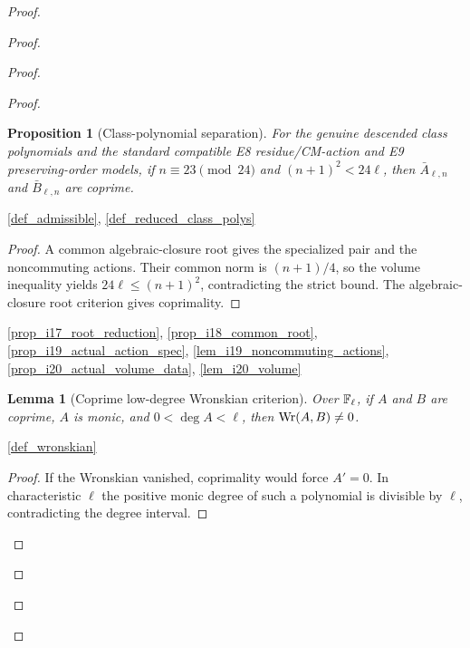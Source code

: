\documentclass[11pt,a4paper]{article}
\numberwithin{equation}{section}
\theoremstyle{plain}\newtheorem{theorem}{Theorem}[section]\newaliascnt{proposition}{theorem}\newtheorem{proposition}[proposition]{Proposition}\aliascntresetthe{proposition}\newaliascnt{lemma}{theorem}\newtheorem{lemma}[lemma]{Lemma}\aliascntresetthe{lemma}
\theoremstyle{definition}\newaliascnt{definition}{theorem}\newtheorem{definition}[definition]{Definition}\aliascntresetthe{definition}\newaliascnt{notation}{theorem}\newtheorem{notation}[notation]{Notation}\aliascntresetthe{notation}
\providecommand{\lean}[1]{}\providecommand{\leanok}{}
\begin{document}
\begin{proof}
\begin{proof}
\begin{proof}
\begin{proof}
\begin{proposition}[Class-polynomial separation]\label{prop_class_poly_separation}\lean{SptCM.CM.Repaired.ActualClassPolynomialSpec.actualClassPolynomials_isCoprime_of_goodReduction_E8_E9}\leanok
For the genuine descended class polynomials and the standard compatible
E8 residue/CM-action and E9 preserving-order models, if
$n\equiv23\pmod {24}$ and $(n+1)^2<24\ell$, then
$\bar A_{\ell,n}$ and $\bar B_{\ell,n}$ are coprime.
\end{proposition}
\begin{uses-statement}\ref{def_admissible}, \ref{def_reduced_class_polys}\end{uses-statement}
\begin{proof}
A common algebraic-closure root gives the specialized pair and the noncommuting actions.  Their common norm is $(n+1)/4$, so the volume inequality yields $24\ell\le(n+1)^2$, contradicting the strict bound.  The algebraic-closure root criterion gives coprimality.
\end{proof}
\begin{uses-proof}\ref{prop_i17_root_reduction}, \ref{prop_i18_common_root}, \ref{prop_i19_actual_action_spec}, \ref{lem_i19_noncommuting_actions}, \ref{prop_i20_actual_volume_data}, \ref{lem_i20_volume}\end{uses-proof}

\begin{lemma}[Coprime low-degree Wronskian criterion]\label{lem_wronskian_coprime_degree}\lean{SptCM.wronskianObstruction_ne_zero_zmod}\leanok
Over $\mathbb F_\ell$, if $A$ and $B$ are coprime, $A$ is monic, and
$0<\deg A<\ell$, then $\operatorname{Wr}(A,B)\ne0$.
\end{lemma}
\begin{uses-statement}\ref{def_wronskian}\end{uses-statement}
\begin{proof}
If the Wronskian vanished, coprimality would force $A'=0$.  In
characteristic $\ell$ the positive monic degree of such a polynomial is
divisible by $\ell$, contradicting the degree interval.
\end{proof}


\end{proof}
\end{proof}
\end{proof}
\end{proof}
\end{document}
